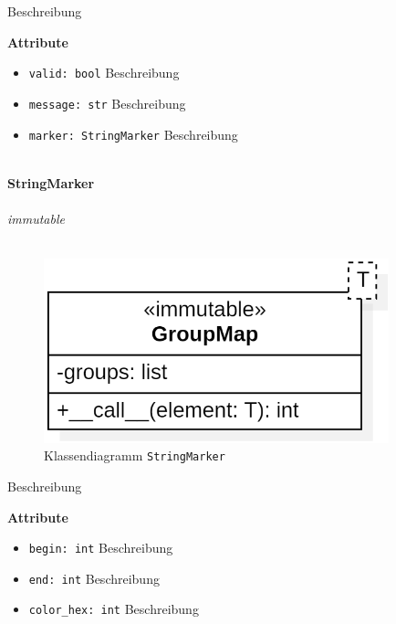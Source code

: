 \documentclass{article}
\begin{document}
\begin{itemize}
Beschreibung
\newline \newline

\textbf{Attribute}
\begin{itemize}
\item \texttt{valid: bool} \newline Beschreibung
\item \texttt{message: str} \newline Beschreibung
\item \texttt{marker: StringMarker} \newline Beschreibung
\\\\
\end{itemize}


\newpage
\textbf{\large{StringMarker}}\\\\
\textit{\flqq{}immutable\frqq}\normalsize\\\\
\begin{figure}[H]%
    \centering
    \includegraphics[width=10cm]{entwurf/Entwurf_dokument/img/cls/model/GroupMap.png}
    \caption{Klassendiagramm \texttt{StringMarker}}
\end{figure}

Beschreibung
\newline \newline

\textbf{Attribute}
\begin{itemize}
\item \texttt{begin: int} \newline Beschreibung
\item \texttt{end: int} \newline Beschreibung
\item \texttt{color_hex: int} \newline Beschreibung
\\\\
\end{itemize}



\end{itemize}
\end{document}
